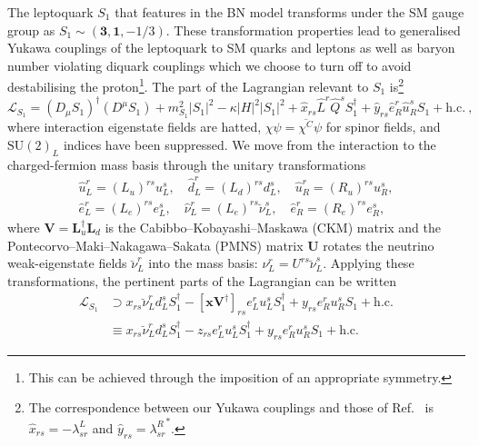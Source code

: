 The leptoquark $S_{1}$ that features in the BN model transforms under the SM
gauge group as $S_{1} \sim (\mathbf{3}, \mathbf{1}, -1/3)$. These transformation
properties lead to generalised Yukawa couplings of the leptoquark to SM quarks
and leptons as well as baryon number violating diquark couplings which we choose
to turn off to avoid destabilising the proton\footnote{This can be achieved
  through the imposition of an appropriate symmetry.}. The part of the
Lagrangian relevant to $S_{1}$ is\footnote{The correspondence between our Yukawa
  couplings and those of Ref.~\cite{Bauer:2015knc} is
  $\hat{x}_{rs} = -\lambda^L_{sr}$ and $\hat{y}_{rs} = {\lambda^R_{sr}}^{*}$.}
\begin{equation}
  \label{eq:ch3-Lagra}
  \mathscr{L}_{S_{1}} = (D_\mu S_{1})^\dagger (D^\mu S_{1}) + m_{S_1}^2 |S_{1}|^2 - \kappa |H|^2 |S_{1}|^2 + \hat{x}_{rs} \hat{L}^r \hat{Q}^s S_{1}^\dagger
  + \hat{y}_{rs} \hat{e}_R^r \hat{u}_R^s S_{1} + \text{h.c.} \ ,
\end{equation}
where interaction eigenstate fields are hatted,
$\chi \psi = \overline{\chi^C} \psi$ for spinor fields, and $\mathrm{SU}(2)_L$
indices have been suppressed. We move from the interaction to the
charged-fermion mass basis through the unitary transformations
\begin{equation}
  \begin{split}
    \hat{u}_L^r = (L_u)^{rs} u_L^s, \quad \hat{d}_L^r = (L_d)^{rs} d_L^s, \quad \hat{u}^r_R = (R_u)^{rs} u^s_R,\\
    \hat{e}_L^r = (L_e)^{rs} e_L^s, \quad \hat{\nu}_L^r = (L_e)^{rs} \breve{\nu}_L^s, \quad \hat{e}_R^r = (R_e)^{rs} e_R^s,
  \end{split}
\end{equation}
where $\mathbf{V} = \mathbf{L}_u^\dagger \mathbf{L}_d$ is the
Cabibbo--Kobayashi--Maskawa (CKM) matrix and the
Pontecorvo--Maki--Nakagawa--Sakata (PMNS) matrix $\mathbf{U}$ rotates the
neutrino weak-eigenstate fields $\breve{\nu}_L^r$ into the mass basis: $\nu_L^r
= U^{rs} \breve{\nu}_L^s$. Applying these transformations, the pertinent parts
of the Lagrangian can be written
\begin{equation}
  \begin{split}
    \label{eq:ch3-Lagray}
    \mathscr{L}_{S_{1}} &\supset x_{rs} \breve{\nu}_L^r d_L^s S_{1}^\dagger - [\mathbf{x} \mathbf{V}^\dagger]_{rs} e_L^r u_L^s S_{1}^\dagger + y_{rs} e_R^r u_R^s S_{1} + \text{h.c.}\\
    &\equiv x_{rs} \breve{\nu}_L^r d_L^s S_{1}^\dagger - z_{rs} e_L^r u_L^s S_{1}^\dagger + y_{rs}
    e_R^r u_R^s S_{1} + \text{h.c.}
  \end{split}
\end{equation}
